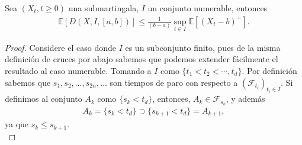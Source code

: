 \begin{proposition}
\label{desi_cruces}
	Sea $(X_t, t \geq 0)$ una submartingala, $I$ un conjunto numerable, entonces
    \begin{align*}
		\mathbb{E} \left[ D(X, I, [a, b]) \right] \leq \frac{1}{(b-a)} \sup_{t \in I} \mathbb{E} \left[ (X_t - b)^{+} \right].
	\end{align*}
\end{proposition}
\begin{proof}
	Considere el caso donde $I$ es un subconjunto finito, pues de la misma definición de cruces por abajo sabemos que podemos extender fácilmente el resultado al caso numerable. Tomando a $I$ como $\{t_1 < t_2 < \cdots, t_d\}$. Por definición sabemos que $s_1, s_2, \ldots, s_{2n}, \ldots$ son tiempos de paro con respecto a $(\mathcal{F}_{t_{i}})_{t_{i} \in I}$. Si definimos al conjunto $A_k$ como $\{ s_k < t_d \}$, entonces, $A_k \in \mathcal{F}_{s_k}$, y además
	\begin{align*}
		A_k = \{ s_k < t_d \} \supset \{ s_{k+1} < t_d \} = A_{k+1},
	\end{align*}
ya que $s_k \leq s_{k+1}$. \\


\end{proof}

